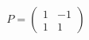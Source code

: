 \documentclass[preview]{standalone}
\begin{document}
\begin{align*}
P = \begin{pmatrix} 1 & -1 \\ 1 & 1 \end{pmatrix}
\end{align*}
\end{document}
